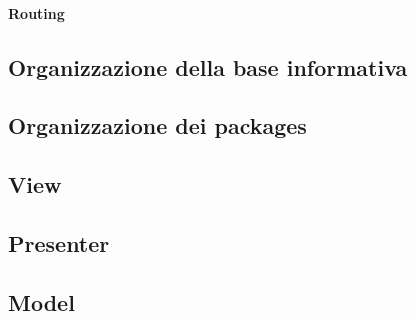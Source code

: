 \paragraph*{Routing\\}

\newpage

\subsection{Organizzazione della base informativa}

\newpage

\subsection{Organizzazione dei packages}

\newpage

\subsection{View}

\newpage
\subsection{Presenter}

\newpage
\subsection{Model}

\newpage